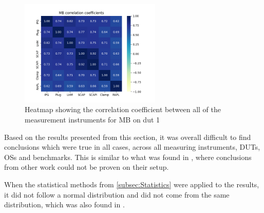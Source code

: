 \begin{figure}[H]
    \centering
    \hspace*{-1cm} %
    \includegraphics[width=0.6\textwidth]{figures/MandelbrotDut1.png}
    \caption{Heatmap showing the correlation coefficient between all of the measurement instruments for MB on dut 1}
    \label{fig:mandelCorrDut1}
\end{figure}

Based on the results presented from this section, it was overall difficult to find conclusions which were true in all cases, across all measuring instruments, DUTs, OSs and benchmarks. This is similar to what was found in \cite{Ournani2020}, where conclusions from other work could not be proven on their setup.







When the statistical methods from \cref{subsec:Statistics} were applied to the results, it did not follow a normal distribution and did not come from the same distribution, which was also found in \cite{biksbois, Koedijk2022diff}.%


